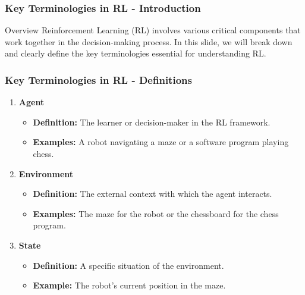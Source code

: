 \documentclass{beamer}
\begin{document}
\begin{frame}[fragile]
    \frametitle{Key Terminologies in RL - Introduction}
    \begin{block}{Overview}
        Reinforcement Learning (RL) involves various critical components that work together in the decision-making process. 
        In this slide, we will break down and clearly define the key terminologies essential for understanding RL.
    \end{block}
\end{frame}

\begin{frame}[fragile]
    \frametitle{Key Terminologies in RL - Definitions}
    \begin{enumerate}
        \item \textbf{Agent}  
            \begin{itemize}
                \item \textbf{Definition:} The learner or decision-maker in the RL framework.
                \item \textbf{Examples:} A robot navigating a maze or a software program playing chess.
            \end{itemize}

        \item \textbf{Environment}  
            \begin{itemize}
                \item \textbf{Definition:} The external context with which the agent interacts.
                \item \textbf{Examples:} The maze for the robot or the chessboard for the chess program.
            \end{itemize}
        
        \item \textbf{State}  
            \begin{itemize}
                \item \textbf{Definition:} A specific situation of the environment.
                \item \textbf{Example:} The robot’s current position in the maze.
            \end{itemize}
    \end{enumerate}
\end{frame}
\end{document}
